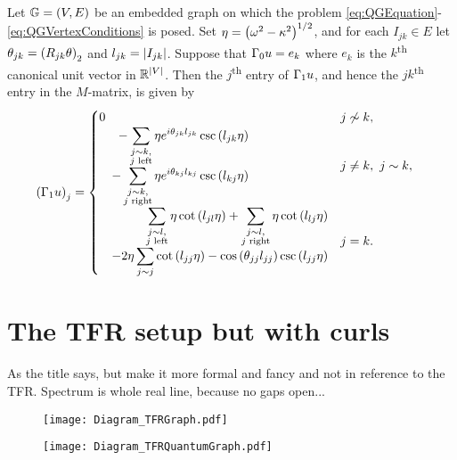 \begin{prop}
	Let $\mathbb{G}=\left( V,E \right)$ be an embedded graph on which the problem \eqref{eq:QGEquation}-\eqref{eq:QGVertexConditions} is posed.
	Set $\eta = \left( \omega^2-\kappa^2 \right)^{1/2}$, and for each $I_{jk}\in E$ let $\theta_{jk} = \left( R_{jk}\theta \right)_2$ and $l_{jk} = \left\lvert I_{jk} \right\rvert$.
	Suppose that $\Gamma_0 u = e_k$ where $e_k$ is the $k$\textsuperscript{th} canonical unit vector in $\mathbb{R}^{\left\lvert V \right\rvert}$.
	Then the $j$\textsuperscript{th} entry of $\Gamma_1 u$, and hence the $jk$\textsuperscript{th} entry in the $M$-matrix, is given by 
	\begin{align*}
		\left( \Gamma_1 u \right)_j &= 
		\begin{cases}
			\!\begin{aligned}
				0	
			\end{aligned}			
			& j \not\sim k, \\
			\!\begin{aligned}
				-\sum_{\substack{j\sim k, \\ j \text{ left}}} \eta e^{i\theta_{jk}l_{jk}} \csc\left( l_{jk}\eta \right) 
				\\ \quad - \sum_{\substack{j\sim k, \\ j \text{ right}}} \eta e^{i\theta_{kj}l_{kj}} \csc\left( l_{kj}\eta \right)
			\end{aligned}
			& j\neq k, \ j\sim k, \\
			\!\begin{aligned}
				\sum_{\substack{j\sim l, \\ j \text{ left}}} \eta\cot\left( l_{jl}\eta \right)
				+ \sum_{\substack{j\sim l, \\ j \text{ right}}} \eta\cot\left( l_{lj}\eta \right)
				\\ \quad - 2\eta\sum_{j\sim j} \cot\left( l_{jj}\eta \right) - \cos\left( \theta_{jj}l_{jj} \right)\csc\left( l_{jj}\eta \right)
			\end{aligned}
			& j=k.
		\end{cases}
	\end{align*}
\end{prop}

\section{The TFR setup but with curls}
As the title says, but make it more formal and fancy and not in reference to the TFR. 
Spectrum is whole real line, because no gaps open...
\begin{figure}[h]
	\centering
	\texttt{[image: Diagram\_TFRGraph.pdf]}
	\caption{\label{fig:Diagram_TFRGraph}}
\end{figure}
\begin{figure}[h]
	\centering
	\texttt{[image: Diagram\_TFRQuantumGraph.pdf]}
	\caption{\label{fig:Diagram_TFRQuantumGraph}}
\end{figure}

